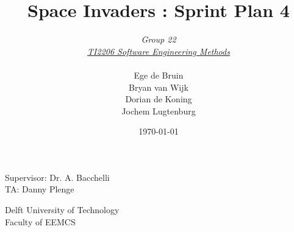 \documentclass[10pt]{article}
\begin{document}
\title{Space Invaders : Sprint Plan 4}
\date{\today}
\author{\textit{Group 22}\\ \textit{\underline{TI2206 Software Engineering Methods}} \\
 \\Ege de Bruin \\ Bryan van Wijk \\ Dorian de Koning \\ Jochem Lugtenburg }
 \maketitle  
 \begin{center}
Supervisor: Dr. A. Bacchelli\\
TA: Danny Plenge\\
 \end{center}     
 \begin{center}
 Delft University of Technology\\
 Faculty of EEMCS\\
 \end{center}
 \thispagestyle{empty}
 \pagebreak
 
\end{document}
